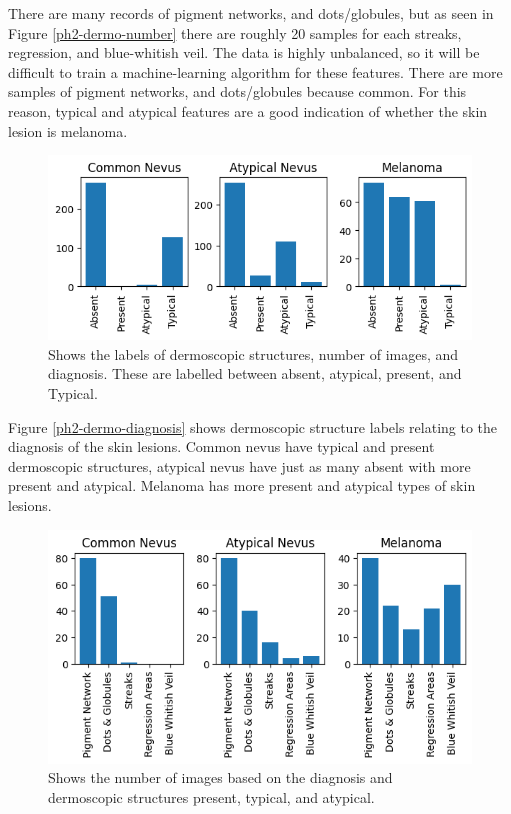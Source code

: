 There are many records of pigment networks, and dots/globules, but as seen in Figure \ref{ph2-dermo-number} there are roughly 20 samples for each streaks, regression, and blue-whitish veil. The data is highly unbalanced, so it will be difficult to train a machine-learning algorithm for these features. There are more samples of pigment networks, and dots/globules because common. For this reason, typical and atypical features are a good indication of whether the skin lesion is melanoma.

\begin{figure}
	\centering
	\includegraphics[scale=0.8]{images/ph2/ph2-dermo-diagnosis.png}
	\caption{Shows the labels of dermoscopic structures, number of images, and diagnosis. These are labelled between absent, atypical, present, and Typical.} 
\end{figure} \label{ph2-dermo-diagnosis}

Figure \ref{ph2-dermo-diagnosis} shows dermoscopic structure labels relating to the diagnosis of the skin lesions. Common nevus have typical and present dermoscopic structures, atypical nevus have just as many absent with more present and atypical. Melanoma has more present and atypical types of skin lesions. 

\begin{figure}
	\centering
	\includegraphics[scale=0.8]{images/ph2/ph2-number-diagnosis-dermo.png}
	\caption{Shows the number of images based on the diagnosis and dermoscopic structures present, typical, and atypical.} 
\end{figure} \label{ph2-number-diagnosis-dermo}

